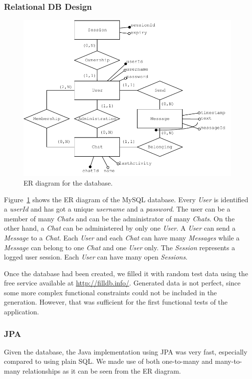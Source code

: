 \documentclass[10pt]{article}
\begin{document}
\subsubsection{Relational DB Design}
\begin{figure}[]
    \centering
    \includegraphics[width=\textwidth]{figs/ER}
    \caption{ER diagram for the database.}
    \label{fig:er}
\end{figure}

Figure~\ref{fig:er} shows the ER diagram of the MySQL database. Every \emph{User} 
is identified a \emph{userId} and has got a unique \emph{username} and a 
\emph{password}. The user can be a member of many \emph{Chats} and can 
be the administrator of many \emph{Chats}. On the other hand, a \emph{Chat} 
can be administered by only one \emph{User}. A \emph{User} can send a 
\emph{Message} to a \emph{Chat}. Each \emph{User} and each \emph{Chat} can 
have many \emph{Messages} while a \emph{Message} can belong to one \emph{Chat}
and one \emph{User} only. The \emph{Session} represents a logged user session.
Each \emph{User} can have many open \emph{Sessions}.

Once the database had been created, we filled it with random test data using the free
service available at \url{http://filldb.info/}. Generated data is not perfect, 
since some more complex functional constraints could not be included in the 
generation. However, that was sufficient for the first functional tests of the
application.

\subsubsection{JPA}
Given the database, the Java implementation using JPA was very fast, especially
compared to using plain SQL. We made use of both one-to-many and many-to-many 
relationships as it can be seen from the ER diagram.
\end{document}
